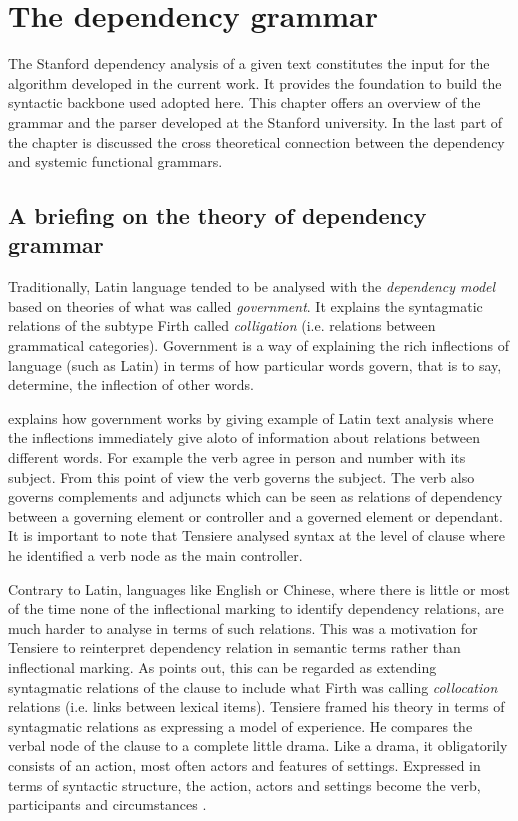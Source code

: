 \chapter{The dependency grammar}
\label{ch:dependecy-grappamr}

The Stanford dependency analysis of a given text constitutes the input for the algorithm developed in the current work. It provides the foundation to build the syntactic backbone used adopted here. This chapter offers an overview of the grammar and the parser developed at the Stanford university. In the last part of the chapter is discussed the cross theoretical connection between the dependency and systemic functional grammars. 

\section{A briefing on the theory of dependency grammar}
Traditionally, Latin language tended to be analysed with the \textit{dependency model} based on theories of what was called \textit{government}. It explains the syntagmatic relations of the subtype Firth called \textit{colligation} (i.e. relations between grammatical categories). Government is a way of explaining the rich inflections of language (such as Latin) in terms of how particular words govern, that is to say, determine, the inflection of other words. \citep[p.66]{McDonald2008}

\citet{Tensiere2015} explains how government works by giving example of Latin text analysis where the inflections immediately give aloto of information about relations between different words. For example the verb agree in person and number with its subject. From this point of view the verb governs the subject. The verb also governs complements and adjuncts which can be seen as relations of dependency between a governing element or controller and a governed element or dependant. It is important to note that Tensiere analysed syntax at the level of clause where he identified a verb node as the main controller. 

Contrary to Latin, languages like English or Chinese, where there is little or most of the time none of the inflectional marking to identify dependency relations, are much harder to analyse in terms of such relations. This was a motivation for Tensiere to reinterpret dependency relation in semantic terms rather than inflectional marking. As \citet{McDonald2008} points out, this can be regarded as extending syntagmatic relations of the clause to include what Firth was calling \textit{collocation} relations (i.e. links between lexical items). Tensiere framed his theory in terms of syntagmatic relations as expressing a model of experience. He compares the verbal node of the clause to a complete little drama. Like a drama, it obligatorily consists of an action, most often actors and features of settings. Expressed in terms of syntactic structure, the action, actors and settings become the verb, participants and circumstances \citep{Tensiere2015}. 

